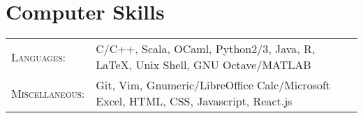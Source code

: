 \section{Computer Skills}
\begin{tabularx}{\width}{@{}lX@{}}
  \textsc{Languages:} & C/C++, Scala, OCaml, Python2/3, Java, R, \LaTeX, Unix
    Shell, GNU Octave/MATLAB \\
  \textsc{Miscellaneous:} & Git, Vim, Gnumeric/LibreOffice Calc/Microsoft Excel,
    HTML, CSS, Javascript, React.js
\end{tabularx}
